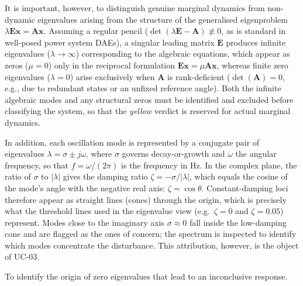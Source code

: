 \begin{description}
        It is important, however, to distinguish genuine marginal dynamics from non-dynamic eigenvalues arising from the structure of the generalised eigenproblem $\lambda\mathbf{E}\mathbf{x}=\mathbf{A}\mathbf{x}$. Assuming a regular pencil ($\det(\lambda\mathbf{E}-\mathbf{A})\not\equiv 0$, as is standard in well-posed power system DAEs), a singular leading matrix $\mathbf{E}$ produces infinite eigenvalues ($\lambda\to\infty$) corresponding to the algebraic equations, which appear as zeros ($\mu=0$) only in the reciprocal formulation $\mathbf{E}\mathbf{x}=\mu\mathbf{A}\mathbf{x}$, whereas finite zero eigenvalues ($\lambda=0$) arise exclusively when $\mathbf{A}$ is rank-deficient ($\det(\mathbf{A})=0$, e.g., due to redundant states or an unfixed reference angle). Both the infinite algebraic modes and any structural zeros must be identified and excluded before classifying the system, so that the \emph{yellow} verdict is reserved for actual marginal dynamics.

        In addition, each oscillation mode is represented by a conjugate pair of eigenvalues $\lambda=\sigma\pm j\omega$, where $\sigma$ governs decay-or-growth and $\omega$ the angular frequency, so that $f=\omega/(2\pi)$ is the frequency in Hz. In the complex plane, the ratio of $\sigma$ to $|\lambda|$ gives the damping ratio $\zeta=-\sigma/\lvert\lambda\rvert$, which equals the cosine of the mode's angle with the negative real axis: $\zeta=\cos\theta$. Constant-damping loci therefore appear as straight lines (cones) through the origin, which is precisely what the threshold lines used in the eigenvalue view (e.g.\ $\zeta=0$ and $\zeta=0.05$) represent. Modes close to the imaginary axis $\sigma\approx 0$ fall inside the low-damping cone and are flagged as the ones of concern; the spectrum is inspected to identify which modes concentrate the disturbance. This attribution, however, is the object of UC-03.
  \item[Possible bottlenecks.] To identify the origin of zero eigenvalues that lead to an inconclusive response.


\end{description}
